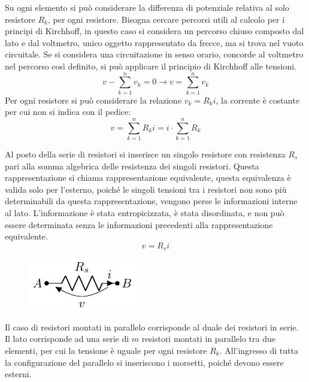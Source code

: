 \documentclass{article}
\numberwithin{equation}{subsection}
\begin{document}
Su ogni elemento si può considerare la differenza di potenziale relativa al solo resistore $R_k$, per ogni resistore. 
Bisogna cercare percorsi utili al calcolo per i principi di Kirchhoff, in questo caso si considera un percorso chiuso composto dal lato e dal voltmetro, unico oggetto 
rappresentato da frecce, ma si trova nel vuoto circuitale.  Se si considera una circuitazione in senso orario, concorde al voltmetro nel percorso così definito, si può 
applicare il principio di Kirchhoff alle tensioni. 
\begin{equation*}
    v-\displaystyle\sum_{k=1}^nv_k=0\to v=\displaystyle\sum_{k=1}^nv_k
\end{equation*}
Per ogni resistore si può considerare la relazione $v_k=R_ki$, la corrente è costante per cui non si indica con il pedice:
\begin{equation*}
    v=\displaystyle\sum_{k=1}^nR_ki=i\cdot\sum_{k=1}^nR_k
\end{equation*}

Al posto della serie di resistori si inserisce un singolo resistore con resistenza $R_s$ pari alla somma algebrica delle resistenza dei singoli resistori. Questa 
rappresentazione si chiama rappresentazione equivalente, questa equivalenza è valida solo per l'esterno, poiché le singoli tensioni tra i 
resistori non sono più determinabili da questa rappresentazione, vengono perse le informazioni interne al lato. L'informazione è stata entropicizzata, è stata disordinata, e 
non può essere determinata senza le informazioni precedenti alla rappresentazione equivalente. 
\begin{equation}
    v=R_si
\end{equation}
\begin{figure}[H]%
    \centering
    \includegraphics{resistori-serie-equivalente.pdf}
    \label{fig:resistori-serie-equivalenti}
\end{figure}


Il caso di resistori montati in parallelo corrisponde al duale dei resistori in serie. Il lato corrisponde ad una serie di $m$ resistori montati in parallelo tra due elementi, 
per cui la tensione è uguale per ogni resistore $R_k$. All'ingresso di tutta la configurazione del parallelo si inseriscono i morsetti, poiché devono essere esterni. 
\end{document}
